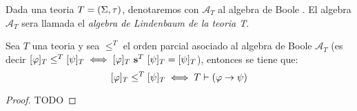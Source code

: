\begin{definition}
  Dada una teoria $T=(\Sigma,\tau)$, denotaremos con $\mathcal{A}_T$ al algebra de Boole \algLin. El algebra
  $\mathcal{A}_T$ sera llamada el \emph{algebra de Lindenbaum de la teoria T}. 
\end{definition}
\begin{lemma}
  Sea $T$ una teoria y sea $\leq^T$ el orden parcial asociado al algebra de Boole $\mathcal{A}_T$ (es decir $[\varphi]_T\leq^T [\psi]_T  \iff [\varphi]_T\ \mathbf{s}^T\ [\psi]_T=[\psi]_T$),
  entonces se tiene que:
  $$
  [\varphi]_T\leq^T[\psi]_T \iff T\vdash(\varphi\rightarrow\psi)
  $$
\end{lemma}
\begin{proof}
  TODO
\end{proof}
